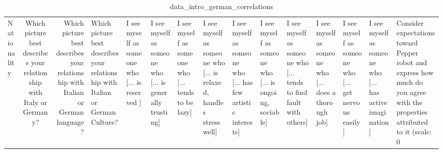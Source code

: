 \begin{table}
\caption{data_intro_german_correlations}
\label{tab:data_intro_german_correlations}
\begin{tabular}{lcr}
\toprule
Nationality & Which picture best describes your relationship with Italy or Germany? & Which picture best describes your relationship with Italian or German language? & Which picture best describes your relationship with Italian or German Culture? & I see myself as someone who  [... is reserved ] & I see myself as someone who  [... is generally trusting] & I see myself as someone who  [... tends to be lazy] & I see myself as someone who  [... is relaxed, handles stress well] & I see myself as someone who  [... has few artistic interests] & I see myself as someone who  [... is ongoing, sociable] & I see myself as someone who  [... tends to find fault with others] & I see myself as someone who  [... does a thorough job] & I see myself as someone who  [... get nervous easily] & I see myself as someone who  [... has active imagination] & Consider expectations toward Pepper robot and express how much do you agree with the properties attributed to it (scale: 0%
\end{tabular}
\end{table}
